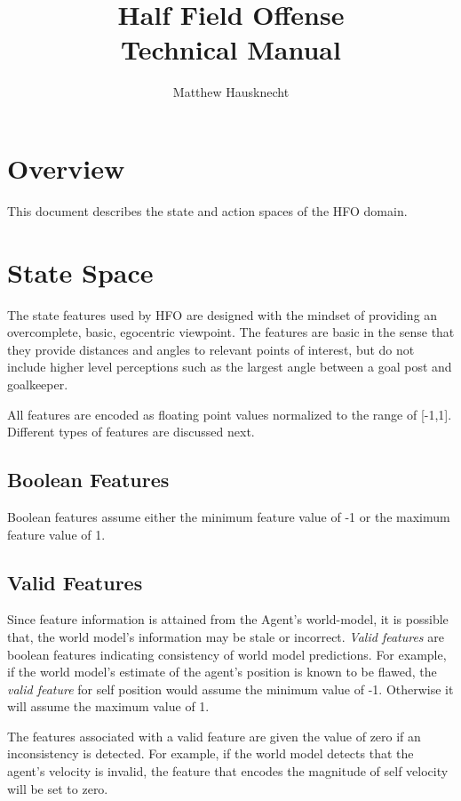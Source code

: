 \documentclass[12pt]{article}
\title{Half Field Offense \\ Technical Manual}
\author{Matthew Hausknecht}
\begin{document}
\maketitle
\tableofcontents

\section{Overview}

This document describes the state and action spaces of the HFO domain.

\section{State Space}

The state features used by HFO are designed with the mindset of
providing an overcomplete, basic, egocentric viewpoint. The features
are basic in the sense that they provide distances and angles to
relevant points of interest, but do not include higher level
perceptions such as the largest angle between a goal post and
goalkeeper.

All features are encoded as floating point values normalized to the
range of [-1,1]. Different types of features are discussed next.

\subsection{Boolean Features}

Boolean features assume either the minimum feature value of -1 or the
maximum feature value of 1.

\subsection{Valid Features}

Since feature information is attained from the Agent's world-model, it
is possible that, the world model's information may be stale or
incorrect. \textit{Valid features} are boolean features indicating
consistency of world model predictions. For example, if the world
model's estimate of the agent's position is known to be flawed, the
\textit{valid feature} for self position would assume the minimum
value of -1. Otherwise it will assume the maximum value of 1.

The features associated with a valid feature are given the value of
zero if an inconsistency is detected. For example, if the world model
detects that the agent's velocity is invalid, the feature that encodes
the magnitude of self velocity will be set to zero.
\end{document}
